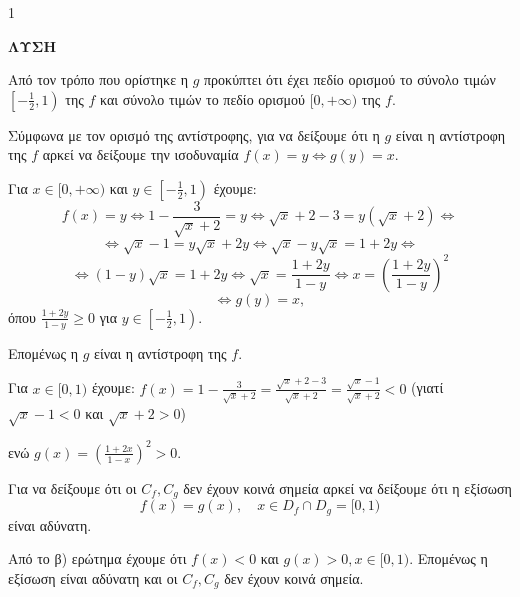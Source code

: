 \begin{ylh}{1}
    \item [Ύλη από εικόνα]
\end{ylh}
\textbf{ΛΥΣΗ}
\begin{alist}
\item Από τον τρόπο που ορίστηκε η $g$ προκύπτει ότι έχει πεδίο ορισμού το σύνολο
τιμών $\left[-\frac{1}{2},1\right)$ της $f$ και σύνολο τιμών το πεδίο ορισμού $[0,+\infty)$ της $f$.

Σύμφωνα με τον ορισμό της αντίστροφης, για να δείξουμε ότι η $g$ είναι η αντίστροφη
της $f$ αρκεί να δείξουμε την ισοδυναμία $f(x)=y \iff g(y)=x$.

Για $x \in [0,+\infty)$ και $y \in \left[-\frac{1}{2},1\right)$ έχουμε:
\[
f(x)=y \iff 1 - \frac{3}{\sqrt{x}+2} = y \iff \sqrt{x}+2-3 = y(\sqrt{x}+2) \iff
\]
\[
\iff \sqrt{x}-1 = y\sqrt{x}+2y \iff \sqrt{x}-y\sqrt{x} = 1+2y \iff
\]
\[
\iff (1-y)\sqrt{x} = 1+2y \iff \sqrt{x} = \frac{1+2y}{1-y} \iff x = \left(\frac{1+2y}{1-y}\right)^2
\]
\[
\iff g(y)=x,
\]
όπου $\frac{1+2y}{1-y} \ge 0$ για $y \in \left[-\frac{1}{2},1\right)$.

Επομένως η $g$ είναι η αντίστροφη της $f$.
\item Για $x \in [0,1)$ έχουμε: $f(x)=1 - \frac{3}{\sqrt{x}+2} = \frac{\sqrt{x}+2-3}{\sqrt{x}+2} = \frac{\sqrt{x}-1}{\sqrt{x}+2} < 0$
(γιατί $\sqrt{x}-1 < 0$ και $\sqrt{x}+2 > 0$)

ενώ $g(x)=\left(\frac{1+2x}{1-x}\right)^2 > 0$.
\item Για να δείξουμε ότι οι $C_f, C_g$ δεν έχουν κοινά σημεία αρκεί να δείξουμε ότι η εξίσωση
\[
f(x) = g(x), \quad x \in D_f \cap D_g = [0,1)
\]
είναι αδύνατη.

Από το β) ερώτημα έχουμε ότι $f(x) < 0$ και $g(x) > 0, x \in [0,1)$.
Επομένως η εξίσωση είναι αδύνατη και οι $C_f, C_g$ δεν έχουν κοινά σημεία.
\end{alist}